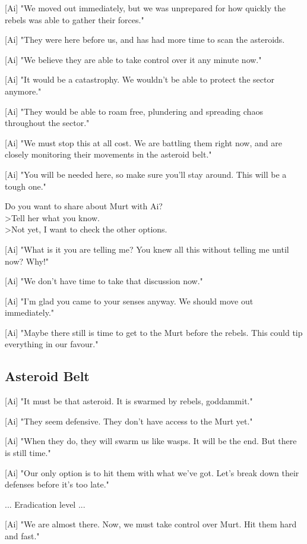 \documentclass[a4paper,12pt]{article}
\begin{document}
[Ai] "We moved out immediately, but we was unprepared for how quickly the rebels was able to gather their forces."

[Ai] "They were here before us, and has had more time to scan the asteroids. 

[Ai] "We believe they are able to take control over it any minute now."

[Ai] "It would be a catastrophy. We wouldn't be able to protect the sector anymore." 

[Ai] "They would be able to roam free, plundering and spreading chaos throughout the sector."

[Ai] "We must stop this at all cost. We are battling them right now, and are closely monitoring their movements in
the asteroid belt."

[Ai] "You will be needed here, so make sure you'll stay around. This will be a tough one."

Do you want to share about Murt with Ai?\\
\textgreater Tell her what you know.\\
\textgreater Not yet, I want to check the other options.

[Ai] "What is it you are telling me? You knew all this without telling me until now? Why!"

[Ai] "We don't have time to take that discussion now." 

[Ai] "I'm glad you came to your senses anyway. We should move out immediately."

[Ai] "Maybe there still is time to get to the Murt before the rebels. This could tip everything in our favour."

\subsection{Asteroid Belt}

[Ai] "It must be that asteroid. It is swarmed by rebels, goddammit."

[Ai] "They seem defensive. They don't have access to the Murt yet." 

[Ai] "When they do, they will swarm us like wasps. It will be the end. But there is still time."

[Ai] "Our only option is to hit them with what we've got. Let's break down their defenses before it's too late."

... Eradication level ...

[Ai] "We are almost there. Now, we must take control over Murt. Hit them hard and fast."
\end{document}
